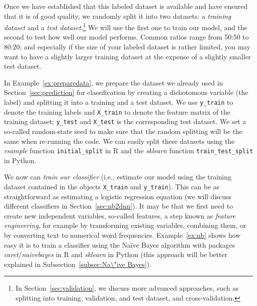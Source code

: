 Once we have established that this labeled dataset is available and
have ensured that it is of good quality, we randomly split it into two
datasets: a \emph{training dataset} and a \emph{test
  dataset}.\footnote{In Section~\ref{sec:validation}, we discuss more
  advanced approaches, such as splitting into training, validation,
  and test dataset, and cross-validation.}  We will use the first one
to train our model, and the second to test how well our model
performs. Common ratios range from 50:50 to 80:20; and especially if
the size of your labeled dataset is rather limited, you may want to
have a slightly larger training dataset at the expense of a slightly
smaller test dataset.

In Example~\ref{ex:preparedata}, we prepare the dataset we already used in
Section~\ref{sec:prediction} for classification by creating a
dichotomous variable (the label) and splitting it into a training and
a test dataset. We use \verb|y_train| to denote the training labels and
\verb|X_train| to denote the feature matrix of the training dataset;
\verb|y_test| and \verb|X_test| is the corresponding test dataset. We set a
so-called random-state seed to make sure that the random splitting
will be the same when re-running the code. We can easily split these datasets using the \emph{rsample} function \texttt{initial\_split} in R and the \emph{sklearn} function \texttt{train\_test\_split} in Python.


We now can \emph{train our classifier} (i.e., estimate our model using the
training dataset contained in the objects \texttt{X\_train} and \texttt{y\_train}). This can be as straightforward as estimating a
logistic regression equation (we will discuss different classifiers in
Section~\ref{sec:nb2dnn}).  It may be that we first need to create new
independent variables, so-called features, a step known as
\emph{feature engineering}, for example by transforming existing
variables, combining them, or by converting text to numerical word
frequencies.
Example~\ref{ex:nb} shows how easy it is to train a classifier using the Na\"ive Bayes algorithm with packages \emph{caret}/\emph{naivebayes} in R and \emph{sklearn} in Python (this approach will be better explained in Subsection~\ref{subsec:Na\"ive Bayes}).


